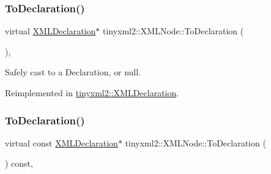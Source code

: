 \mbox{\label{classtinyxml2_1_1_x_m_l_node_a174fd4c22c010b58138c1b84a0dfbd51}} 
\subsubsection{\texorpdfstring{To\+Declaration()}{ToDeclaration()}\hspace{0.1cm}{\footnotesize\ttfamily [1/2]}}
{\footnotesize\ttfamily virtual \mbox{\hyperlink{classtinyxml2_1_1_x_m_l_declaration}{X\+M\+L\+Declaration}}$\ast$ tinyxml2\+::\+X\+M\+L\+Node\+::\+To\+Declaration (\begin{DoxyParamCaption}{ }\end{DoxyParamCaption})\hspace{0.3cm}{\ttfamily [inline]}, {\ttfamily [virtual]}}



Safely cast to a Declaration, or null. 



Reimplemented in \mbox{\hyperlink{classtinyxml2_1_1_x_m_l_declaration_a159d8ac45865215e88059ea1e5b52fc5}{tinyxml2\+::\+X\+M\+L\+Declaration}}.

\mbox{\label{classtinyxml2_1_1_x_m_l_node_ac48bb4bf9eb7bb3654ad4b94945db9a1}} 
\subsubsection{\texorpdfstring{To\+Declaration()}{ToDeclaration()}\hspace{0.1cm}{\footnotesize\ttfamily [2/2]}}
{\footnotesize\ttfamily virtual const \mbox{\hyperlink{classtinyxml2_1_1_x_m_l_declaration}{X\+M\+L\+Declaration}}$\ast$ tinyxml2\+::\+X\+M\+L\+Node\+::\+To\+Declaration (\begin{DoxyParamCaption}{ }\end{DoxyParamCaption}) const\hspace{0.3cm}{\ttfamily [inline]}, {\ttfamily [virtual]}}



